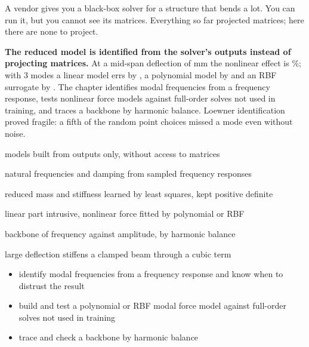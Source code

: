 \newpage\thispagestyle{hl}
\begin{hlquote}A vendor gives you a black-box solver for a structure that bends a lot. You can run it, but you cannot see its matrices. Everything so far projected matrices; here there are none to project.\end{hlquote}
\vspace{8pt}\begin{hlsum}\textbf{The reduced model is identified from the solver's outputs instead of projecting matrices.} At a mid-span deflection of \cnlDefl{} mm the nonlinear effect is \cnlNlEffectPct\%; with 3 modes a linear model errs by \cnlLinThree, a polynomial model by \cnlIceThree{} and an RBF surrogate by \cnlMfsThree. The chapter identifies modal frequencies from a frequency response, tests nonlinear force models against full-order solves not used in training, and traces a backbone by harmonic balance. Loewner identification proved fragile: a fifth of the random point choices missed a mode even without noise.\end{hlsum}
\begin{description}\setlength\itemsep{5pt}\setlength\parsep{0pt}\renewcommand{\descriptionlabel}[1]{\hspace{\labelsep}\sffamily\bfseries\color{hlnavy}#1}
\item[Non-intrusive] models built from outputs only, without access to matrices
\item[Loewner identification] natural frequencies and damping from sampled frequency responses
\item[Operator inference] reduced mass and stiffness learned by least squares, kept positive definite
\item[Hybrid nonlinear modal model] linear part intrusive, nonlinear force fitted by polynomial or RBF
\item[Nonlinear normal mode] backbone of frequency against amplitude, by harmonic balance
\item[Hardening] large deflection stiffens a clamped beam through a cubic term
\end{description}
\begin{itemize}\setlength\itemsep{3pt}
\item identify modal frequencies from a frequency response and know when to distrust the result
\item build and test a polynomial or RBF modal force model against full-order solves not used in training
\item trace and check a backbone by harmonic balance
\end{itemize}
